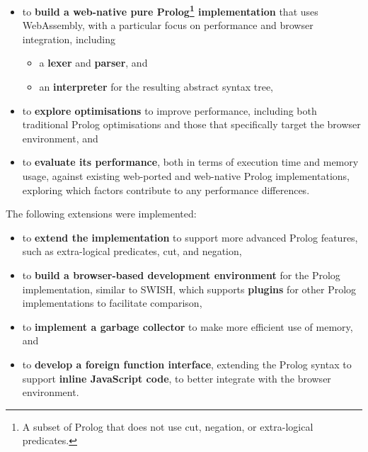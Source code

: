 \begin{itemize}
\item to \textbf{build a web-native pure Prolog\footnote{A subset of Prolog that does not use cut, negation, or extra-logical predicates.} implementation} that uses WebAssembly, with a particular focus on performance and browser integration, including
\begin{itemize}
\item a \textbf{lexer} and \textbf{parser}, and
\item an \textbf{interpreter} for the resulting abstract syntax tree,
\end{itemize}
\item to \textbf{explore optimisations} to improve performance, including both traditional Prolog optimisations and those that specifically target the browser environment, and
\item to \textbf{evaluate its performance}, both in terms of execution time and memory usage, against existing web-ported and web-native Prolog implementations, exploring which factors contribute to any performance differences.
\end{itemize}

The following extensions were implemented:

\begin{itemize}
\item to \textbf{extend the implementation} to support more advanced Prolog features, such as extra-logical predicates, cut, and negation,
\item to \textbf{build a browser-based development environment} for the Prolog implementation, similar to SWISH, which supports \textbf{plugins} for other Prolog implementations to facilitate comparison,
\item to \textbf{implement a garbage collector} to make more efficient use of memory, and
\item to \textbf{develop a foreign function interface}, extending the Prolog syntax to support \textbf{inline JavaScript code}, to better integrate with the browser environment.
\end{itemize}